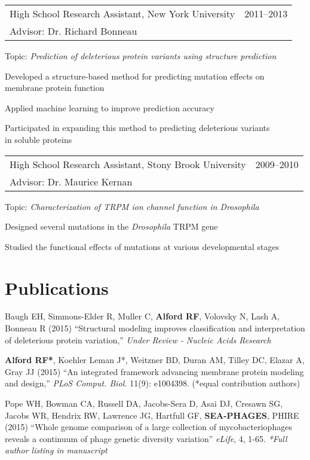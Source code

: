 \documentclass[12pt]{article}
\makeatletter
\newcommand{\allcapsspacing}[1]{{\addfontfeature{LetterSpace=7.5}#1}}
\newcommand{\researchitem}[4]{
\noindent
\begin{tabular*}{\textwidth}{@{\extracolsep{\fill}}lr}
		#1 & #2 \\
		#3 & \\
\end{tabular*}\newline#4\vspace{0.25\baselineskip}\par}
\makeatother
\begin{document}
\researchitem{High School Research Assistant, New York University}{2011--2013}{Advisor: Dr. Richard Bonneau}{Topic: \textit{Prediction of deleterious protein variants using structure prediction}}
\begin{compactitem}
\item Developed a structure-based method for predicting mutation effects on \\ membrane protein function
\item Applied machine learning to improve prediction accuracy
\item Participated in expanding this method to predicting deleterious variants \\ in soluble proteins \\
\end{compactitem}

\researchitem{High School Research Assistant, Stony Brook University}{2009--2010}{Advisor: Dr. Maurice Kernan}{Topic: \textit{Characterization of TRPM ion channel function in Drosophila}}
\begin{compactitem}
\item Designed several mutations in the \textit{Drosophila} TRPM gene 
\item Studied the functional effects of mutations at various developmental stages \\
\end{compactitem}

\section*{\allcapsspacing{Publications}}

\begin{etaremune}
\item Baugh EH, Simmons-Elder R, Muller C, \textbf{Alford RF}, Volovsky N, Lash A, Bonneau R (2015) ``Structural modeling improves classification and interpretation of deleterious protein variation,'' \textit{Under Review - Nucleic Acids Research}

\item \textbf{Alford RF*}, Koehler Leman J*, Weitzner BD, Duran AM, Tilley DC, Elazar A, Gray JJ (2015) ``An integrated framework advancing membrane protein modeling and design,'' \textit{PLoS Comput. Biol.} 11(9): e1004398. (*equal contribution authors)

\item Pope WH, Bowman CA, Russell DA, Jacobs-Sera D, Asai DJ, Cresawn SG, Jacobs WR, Hendrix RW, Lawrence JG, Hartfull GF, \textbf{SEA-PHAGES}, PHIRE (2015) ``Whole genome comparison of a large collection of mycobacteriophages reveals a continuum of phage genetic diversity variation'' \textit{eLife}, 4, 1-65. \textit{*Full author listing in manuscript}
\end{etaremune}
\end{document}
